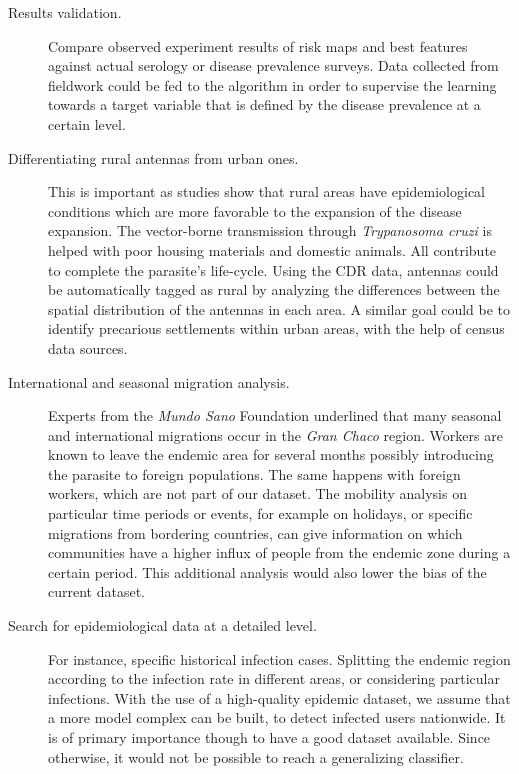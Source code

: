 \begin{description}
    \item [Results validation.] Compare observed experiment results of risk maps and best features against actual serology or disease prevalence surveys.
    Data collected from fieldwork could be fed to the algorithm in order to supervise the learning towards a target variable that is defined by the disease prevalence at a certain level.


    \item [Differentiating rural antennas from urban ones.] This is important as studies show that rural areas have epidemiological conditions which are more favorable to the expansion of the disease expansion.
    The vector-borne transmission through \textit{Trypanosoma cruzi} is helped with poor housing materials and domestic animals.
    All  contribute to complete the parasite's life-cycle.
    Using the CDR data, antennas could be automatically tagged as rural by analyzing the differences between the spatial distribution of the antennas in each area.
    A similar goal could be to identify precarious settlements within urban areas, with the help of census data sources.

    \item [International and seasonal migration analysis.] Experts from the \textit{Mundo Sano} Foundation underlined that many seasonal and international migrations occur in the \textit{Gran Chaco} region.
    Workers are known to leave the endemic area for several months possibly introducing the parasite to foreign populations.
    The same happens with foreign workers, which are not part of our dataset.
    The mobility analysis on particular time periods or events, for example on holidays, or specific migrations from bordering countries, can give information on which communities have a higher influx of people from the endemic zone during a certain period.
    This additional analysis would also lower the bias of the current dataset.


    \item [Search for epidemiological data at a detailed level.] For instance, specific historical infection cases.
    Splitting the endemic region according to the infection rate in different areas, or considering particular infections.
    With the use of a high-quality epidemic dataset, we assume that a more model complex can be built, to detect infected users nationwide.
    It is of primary importance though to have a good dataset available.
    Since otherwise, it would not be possible to reach a generalizing classifier.


\end{description}
